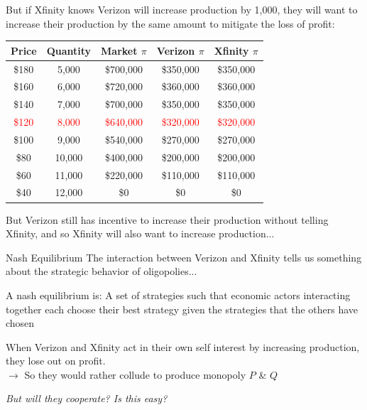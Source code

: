 \documentclass[compress]{beamer}
\begin{document}
\begin{frame}{}
    But if Xfinity knows Verizon will increase production by 1,000, they will want to increase their production by the same amount to mitigate the loss of profit:
   \begin{table}[H]
    \centering
    \begin{tabular}{c|c|c|c|c}
        Price & Quantity & Market \; $\pi$ & Verizon \; $\pi$ & Xfinity \; $\pi$ \\
        \hline
        \$180 & 5,000 & \$700,000 & \$350,000 & \$350,000\\ 
        \$160 & 6,000 & \$720,000 & \$360,000 & \$360,000\\ 
        \$140 & 7,000 & \$700,000 & \$350,000 & \$350,000\\ 
        \textcolor{red}{\$120} &
        \textcolor{red}{8,000} &
        \textcolor{red}{\$640,000} &
        \textcolor{red}{\$320,000} &
        \textcolor{red}{\$320,000}\\
        \$100 & 9,000 & \$540,000 & \$270,000 & \$270,000\\ 
        \$80 & 10,000 & \$400,000 & \$200,000 & \$200,000\\ 
        \$60 & 11,000 & \$220,000 & \$110,000 & \$110,000\\ 
        \$40 & 12,000 & \$0 & \$0 & \$0\\
    \end{tabular}
    \label{tab:placeholder}
\end{table}
But Verizon still has incentive to increase their production without telling Xfinity, and so Xfinity will also want to increase production...
\end{frame}

\begin{frame}{Nash Equilibrium}
    The interaction between Verizon and Xfinity tells us something about the strategic behavior of oligopolies...

    \begin{block}{A nash equilibrium is:}
        A set of strategies such that economic actors interacting together each choose their best strategy given the strategies that the others have chosen
    \end{block}
    \vspace{4mm}
    When Verizon and Xfinity act in their own self interest by increasing production, they lose out on profit.\\
    $\to$ So they would rather collude to produce monopoly $P$ \& $Q$
    \begin{center}
        \textit{But will they cooperate? Is this easy?}
    \end{center}
\end{frame}
\end{document}
